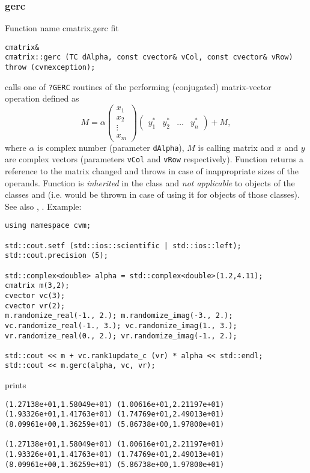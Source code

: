 \subsubsection{gerc}
Function%
\pdfdest name {cmatrix.gerc} fit
\begin{verbatim}
cmatrix&
cmatrix::gerc (TC dAlpha, const cvector& vCol, const cvector& vRow)
throw (cvmexception);
\end{verbatim}
calls one of \verb"?GERC" routines of the
performing  
(conjugated)
matrix-vector operation defined as
\begin{equation*}
M=\alpha\begin{pmatrix}
x_1 \\
x_2 \\
\vdots \\
x_m
\end{pmatrix}
\begin{pmatrix}
y_1^* & y_2^* & \hdots & y_n^*
\end{pmatrix} + M,
\end{equation*}
where $\alpha$ is  complex number
(parameter \verb"dAlpha"),
$M$ is  calling matrix
and $x$ and $y$ are complex vectors (parameters \verb"vCol"
and \verb"vRow" respectively).
Function
returns a reference to the matrix changed and throws
in case of inappropriate sizes of the operands.
Function is \emph{inherited} in the class
 and
\emph{not applicable} to objects of the classes
 and
 (i.e.  would be thrown
in case of using it for objects of those classes).
See also
,
.
Example:
\begin{Verbatim}
using namespace cvm;

std::cout.setf (std::ios::scientific | std::ios::left); 
std::cout.precision (5);

std::complex<double> alpha = std::complex<double>(1.2,4.11);
cmatrix m(3,2);
cvector vc(3);
cvector vr(2);
m.randomize_real(-1., 2.); m.randomize_imag(-3., 2.);
vc.randomize_real(-1., 3.); vc.randomize_imag(1., 3.); 
vr.randomize_real(0., 2.); vr.randomize_imag(-1., 2.); 

std::cout << m + vc.rank1update_c (vr) * alpha << std::endl;
std::cout << m.gerc(alpha, vc, vr);
\end{Verbatim}
prints
\begin{Verbatim}
(1.27138e+01,1.58049e+01) (1.00616e+01,2.21197e+01)
(1.93326e+01,1.41763e+01) (1.74769e+01,2.49013e+01)
(8.09961e+00,1.36259e+01) (5.86738e+00,1.97800e+01)

(1.27138e+01,1.58049e+01) (1.00616e+01,2.21197e+01)
(1.93326e+01,1.41763e+01) (1.74769e+01,2.49013e+01)
(8.09961e+00,1.36259e+01) (5.86738e+00,1.97800e+01)
\end{Verbatim}
\newpage




